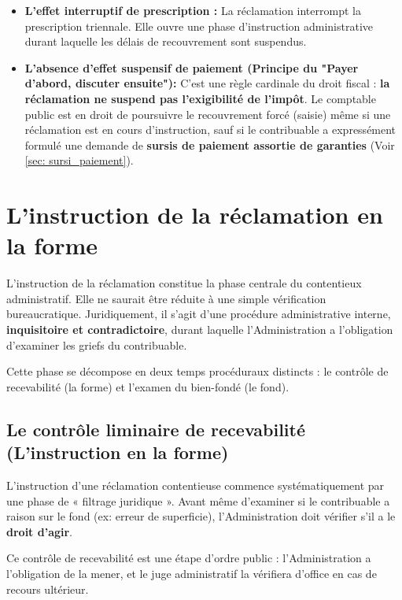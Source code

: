 \documentclass[Cours_contentieuxTF2026.tex]{subfiles}
\begin{document}
\begin{itemize}[label=\tiny$\blacksquare$]
	\item \textbf{L'effet interruptif de prescription :} La réclamation interrompt la prescription triennale. Elle ouvre une phase d'instruction administrative durant laquelle les délais de recouvrement sont suspendus.
	
	\item \textbf{L'absence d'effet suspensif de paiement (Principe du "Payer d'abord, discuter ensuite"): } 
   C'est une règle cardinale du droit fiscal : \textbf{la réclamation ne suspend pas l'exigibilité de l'impôt}. Le comptable public est en droit de poursuivre le recouvrement forcé (saisie) même si une réclamation est en cours d'instruction, sauf si le contribuable a expressément formulé une demande de\textbf{ sursis de paiement assortie de garanties} (Voir \ref*{sec: sursi_paiement}).
\end{itemize}


\section{L’instruction de la réclamation en la forme}
L'instruction de la réclamation constitue la phase centrale du contentieux administratif. Elle ne saurait être réduite à une simple vérification bureaucratique. Juridiquement, il s'agit d'une procédure administrative interne, \textbf{inquisitoire et contradictoire}, durant laquelle l'Administration a l'obligation d'examiner les griefs du contribuable.

Cette phase se décompose en deux temps procéduraux distincts : le contrôle de recevabilité (la forme) et l'examen du bien-fondé (le fond).

\subsection{Le contrôle liminaire de recevabilité (L'instruction en la forme)}

L'instruction d'une réclamation contentieuse commence systématiquement par une phase de « filtrage juridique ». Avant même d'examiner si le contribuable a raison sur le fond (ex: erreur de superficie), l'Administration doit vérifier s'il a le \textbf{droit d'agir}.

Ce contrôle de recevabilité est une étape d'ordre public : l'Administration a l'obligation de la mener, et le juge administratif la vérifiera d'office en cas de recours ultérieur.
\end{document}
